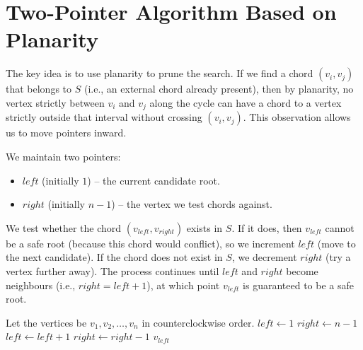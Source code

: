 \section{Two-Pointer Algorithm Based on Planarity}
\label{sec:two_pointer}

The key idea is to use planarity to prune the search. 
If we find a chord \((v_i, v_j)\) that belongs to \(S\) (i.e., an external chord already present), then by planarity, no vertex strictly between \(v_i\) and \(v_j\) along the cycle can have a chord to a vertex strictly outside that interval without crossing \((v_i, v_j)\). 
This observation allows us to move pointers inward.

We maintain two pointers: 
\begin{itemize}
    \item \(left\) (initially \(1\)) – the current candidate root.
    \item \(right\) (initially \(n-1\)) – the vertex we test chords against.
\end{itemize}
We test whether the chord \((v_{left}, v_{right})\) exists in \(S\). 
If it does, then \(v_{left}\) cannot be a safe root (because this chord would conflict), so we increment \(left\) (move to the next candidate). 
If the chord does not exist in \(S\), we decrement \(right\) (try a vertex further away). 
The process continues until \(left\) and \(right\) become neighbours (i.e., \(right = left+1\)), at which point \(v_{left}\) is guaranteed to be a safe root.

\begin{algorithm}[htbp]
    \caption{FindSafeRoot (Two-pointer method)}
    \label{alg:find_safe_root}
    \begin{algorithmic}[1]
            \State Let the vertices be $v_1, v_2, \dots, v_n$ in counterclockwise order.
            \State $left \gets 1$
            \State $right \gets n-1$  
                    \State $left \gets left + 1$  
                \Else
                    \State $right \gets right - 1$  
                \EndIf
            \EndWhile
            \State \Return $v_{left}$  
        \EndProcedure
    \end{algorithmic}
\end{algorithm}


